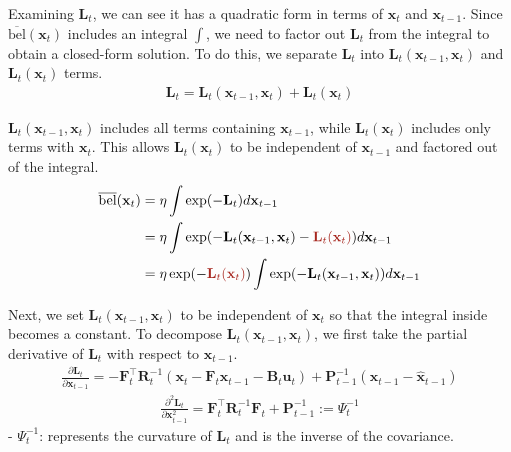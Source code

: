 \documentclass[10pt]{article}
\begin{document}
Examining $\mathbf{L}_t$, we can see it has a quadratic form in terms of $\mathbf{x}_t$ and $\mathbf{x}_{t-1}$. Since $\overline{\text{bel}}(\mathbf{x}_{t})$ includes an integral $\int$, we need to factor out $\mathbf{L}_t$ from the integral to obtain a closed-form solution. To do this, we separate $\mathbf{L}_t$ into $\mathbf{L}_t(\mathbf{x}_{t-1}, \mathbf{x}_t)$ and $\mathbf{L}_t(\mathbf{x}_t)$ terms.
\begin{equation}
	\begin{aligned}
		\mathbf{L}_t = \mathbf{L}_t(\mathbf{x}_{t-1}, \mathbf{x}_t) + \mathbf{L}_t(\mathbf{x}_t)
	\end{aligned}
\end{equation}

$\mathbf{L}_t(\mathbf{x}_{t-1}, \mathbf{x}_t)$ includes all terms containing $\mathbf{x}_{t-1}$, while $\mathbf{L}_t(\mathbf{x}_t)$ includes only terms with $\mathbf{x}_t$. This allows $\mathbf{L}_t(\mathbf{x}_t)$ to be independent of $\mathbf{x}_{t-1}$ and factored out of the integral.
\begin{equation}  \label{eq:derivkf4}
	\begin{aligned} 
		\overline{\text{bel}}(\mathbf{x}_{t}) & = \eta \int \exp(-\mathbf{L}_{t}) d \mathbf{x}_{t-1}  \\
		& = \eta \int \exp(-\mathbf{L}_t(\mathbf{x}_{t-1}, \mathbf{x}_t) - {\color{Mahogany}  \mathbf{L}_t(\mathbf{x}_t) } ) d \mathbf{x}_{t-1} \\
		& = \eta \exp(-{\color{Mahogany} \mathbf{L}_t(\mathbf{x}_t) } ) \int \exp(-\mathbf{L}_t(\mathbf{x}_{t-1}, \mathbf{x}_t)) d \mathbf{x}_{t-1}
	\end{aligned} 
\end{equation}

Next, we set $\mathbf{L}_t(\mathbf{x}_{t-1}, \mathbf{x}_t)$ to be independent of $\mathbf{x}_t$ so that the integral inside becomes a constant. To decompose $\mathbf{L}_t(\mathbf{x}_{t-1}, \mathbf{x}_t)$, we first take the partial derivative of $\mathbf{L}_t$ with respect to $\mathbf{x}_{t-1}$.
\begin{equation}  \label{eq:derivkf2}
	\begin{aligned} 
		\frac{\partial \mathbf{L}_t}{\partial \mathbf{x}_{t-1}} = -\mathbf{F}_t^{\intercal}\mathbf{R}_t^{-1}(\mathbf{x}_t - \mathbf{F}_t\mathbf{x}_{t-1} - \mathbf{B}_t \mathbf{u}_t) + \mathbf{P}_{t-1}^{-1}(\mathbf{x}_{t-1} - \hat{\mathbf{x}}_{t-1})
	\end{aligned} 
\end{equation}
\begin{equation}   \label{eq:derivkf3}
	\begin{aligned} 
		\frac{\partial^2 \mathbf{L}_t}{\partial \mathbf{x}^2_{t-1}} = \mathbf{F}^{\intercal}_t\mathbf{R}_t^{-1} \mathbf{F}_t+ \mathbf{P}_{t-1}^{-1} := \Psi_t^{-1}
	\end{aligned} 
\end{equation}
- $\Psi_t^{-1}$: represents the curvature of $\mathbf{L}_t$ and is the inverse of the covariance.\\
\end{document}
